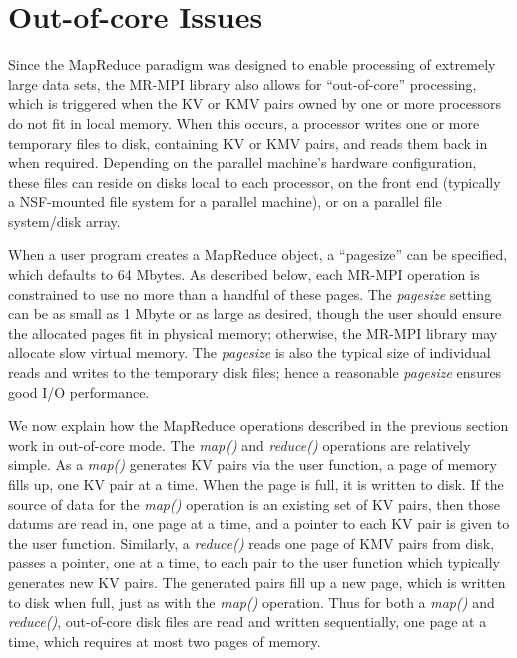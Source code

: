\section{Out-of-core Issues}
\label{sec:outcore}

Since the MapReduce paradigm was designed to enable processing of
extremely large data sets, the MR-MPI library also allows for
``out-of-core'' processing, which is triggered when the KV or KMV
pairs owned by one or more processors do not fit in local memory.
When this occurs, a processor writes one or more temporary files to
disk, containing KV or KMV pairs, and reads them back in when
required.  Depending on the parallel machine's hardware configuration,
these files can reside on disks local to each processor, on the front
end (typically a NSF-mounted file system for a parallel machine), or
on a parallel file system/disk array.

When a user program creates a MapReduce object, a ``pagesize'' can be
specified, which defaults to 64 Mbytes.  As described below, each
MR-MPI operation is constrained to use no more than a handful of
these pages.  The {\it pagesize} setting can be as small as 1 Mbyte or
as large as desired, though the user should ensure the allocated pages
fit in physical memory; otherwise, the MR-MPI library may allocate slow
virtual memory.  The {\it pagesize} is also the typical size of
individual reads and writes to the temporary disk files; hence a
reasonable {\it pagesize} ensures good I/O performance.

We now explain how the MapReduce operations described in the previous
section work in out-of-core mode.  The {\it map()} and {\it reduce()}
operations are relatively simple.  As a {\it map()} generates KV pairs
via the user function, a page of memory fills up, one KV pair at a
time.  When the page is full, it is written to disk.  If the source of
data for the {\it map()} operation is an existing set of KV pairs,
then those datums are read in, one page at a time, and a pointer to
each KV pair is given to the user function.  Similarly, a {\it
reduce()} reads one page of KMV pairs from disk, passes a pointer, one
at a time, to each pair to the user function which typically generates
new KV pairs.  The generated pairs fill up a new page, which is
written to disk when full, just as with the {\it map()} operation.
Thus for both a {\it map()} and {\it reduce()}, out-of-core disk files
are read and written sequentially, one page at a time, which requires
at most two pages of memory.

